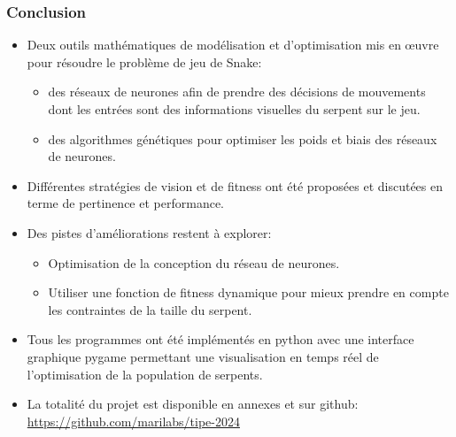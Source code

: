 \documentclass[10pt]{beamer}
\begin{document}
\begin{frame}
\frametitle{Conclusion}
\footnotesize
\begin{itemize}
\item Deux outils mathématiques de modélisation et d'optimisation mis en \oe{}uvre pour résoudre le problème de jeu de Snake:
  \begin{itemize}
  \item des réseaux de neurones afin de prendre des décisions de mouvements dont les entrées sont des informations visuelles du serpent sur le jeu.
  \item des algorithmes génétiques pour optimiser les poids et biais des réseaux de neurones.
  \end{itemize}
\item Différentes stratégies de vision et de fitness ont été proposées et discutées en terme de pertinence et performance.
\item Des pistes d'améliorations restent à explorer:
  \begin{itemize}
  \item Optimisation de la conception du réseau de neurones.
  \item Utiliser une fonction de fitness dynamique pour mieux prendre en compte les contraintes de la taille du serpent.
  \end{itemize}
\item Tous les programmes ont été implémentés en python avec une interface graphique pygame permettant une visualisation en temps réel de l'optimisation de la population de serpents.
\item La totalité du projet est disponible en annexes et sur github: \url{https://github.com/marilabs/tipe-2024}
\end{itemize}
\end{frame}
\end{document}
